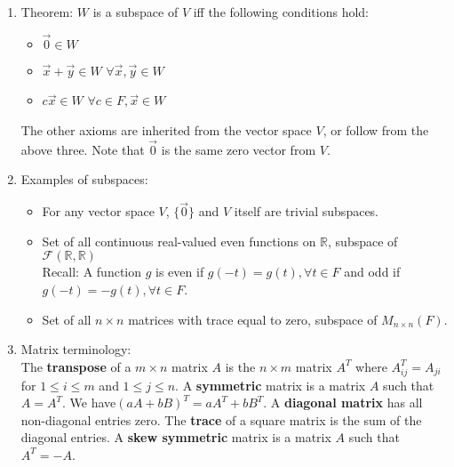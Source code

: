 \documentclass[10pt]{article}
\begin{document}
\begin{multicols*}{2}
\begin{enumerate}
\begin{enumerate}
        \item Theorem: $W$ is a subspace of $V$ iff the following conditions hold:
        \begin{itemize}
            \item $\vec{0} \in W$
            \item $\vec{x} + \vec{y} \in W$ \hspace{1.7mm}$\forall \vec{x}, \vec{y} \in W$
            \item $c\vec{x} \in W$ \hspace{5mm} $\forall c \in F, \vec{x} \in W$
        \end{itemize}
        The other axioms are inherited from the vector space $V$, or follow from the above three. Note that $\vec{0}$ is the same zero vector from $V$.
        
        \item Examples of subspaces:
        \begin{itemize}
            \item For any vector space $V$, $\{\vec{0}\}$ and $V$ itself are trivial subspaces.
            \item Set of all continuous real-valued even functions on $\mathbb{R}$, subspace of $\mathcal{F}(\mathbb{R}, \mathbb{R})$ \\
            Recall: A function $g$ is even if $g(-t) = g(t), \forall t \in F$ and odd if $g(-t) = -g(t), \forall t \in F$.
            
            \item Set of all $n \times n$ matrices with trace equal to zero, subspace of $M_{n \times n}(F)$.
        \end{itemize}
        
        \item Matrix terminology:\\ The \textbf{transpose} of a $m \times n$ matrix $A$ is the $n \times m$ matrix $A^T$ where $A^T_{ij} = A_{ji}$ for $1 \leq i \leq m$ and $1 \leq j \leq n$. A \textbf{symmetric} matrix is a matrix $A$ such that $A = A^T$. We have$(aA + bB)^T = aA^T + bB^T$. A \textbf{diagonal matrix} has all non-diagonal entries zero. The \textbf{trace} of a square matrix is the sum of the diagonal entries. A \textbf{skew symmetric} matrix is a matrix $A$ such that $A^T = -A$. 
        

\end{enumerate}
\end{enumerate}
\end{multicols*}
\end{document}
